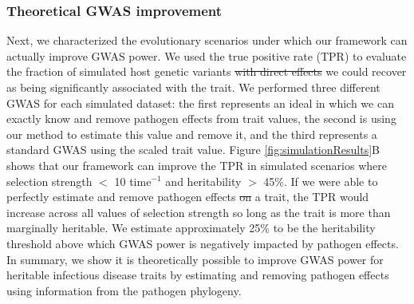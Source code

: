 \documentclass[11pt]{article} %
\providecommand{\DIFadd}[1]{{\protect\color{blue}\uwave{#1}}} %
\providecommand{\DIFdel}[1]{{\protect\color{red}\sout{#1}}}                      %
\providecommand{\DIFaddbegin}{} %
\providecommand{\DIFaddend}{} %
\providecommand{\DIFdelbegin}{} %
\providecommand{\DIFdelend}{} %
\newcommand{\DIFscaledelfig}{0.5}
\newlength{\DIFdelgraphicswidth} %
\newlength{\DIFdelgraphicsheight} %
\newcommand{\DIFaddincludegraphics}[2][]{{\color{blue}\fbox{\DIFOincludegraphics[#1]{#2}}}} %
\newcommand{\DIFdelincludegraphics}[2][]{%
\sbox{\DIFdelgraphicsbox}{\DIFOincludegraphics[#1]{#2}}%
\settoboxwidth{\DIFdelgraphicswidth}{\DIFdelgraphicsbox} %
\settoboxtotalheight{\DIFdelgraphicsheight}{\DIFdelgraphicsbox} %
\scalebox{\DIFscaledelfig}{%
\parbox[b]{\DIFdelgraphicswidth}{\usebox{\DIFdelgraphicsbox}\\[-\baselineskip] \rule{\DIFdelgraphicswidth}{0em}}\llap{\resizebox{\DIFdelgraphicswidth}{\DIFdelgraphicsheight}{%
\setlength{\unitlength}{\DIFdelgraphicswidth}%
\begin{picture}(1,1)%
\thicklines\linethickness{2pt} %
{\color[rgb]{1,0,0}\put(0,0){\framebox(1,1){}}}%
{\color[rgb]{1,0,0}\put(0,0){\line( 1,1){1}}}%
{\color[rgb]{1,0,0}\put(0,1){\line(1,-1){1}}}%
\end{picture}%
}\hspace*{3pt}}} %
} %
\DeclareRobustCommand{\DIFaddbegin}{\DIFOaddbegin \let\includegraphics\DIFaddincludegraphics} %
\DeclareRobustCommand{\DIFaddend}{\DIFOaddend \let\includegraphics\DIFOincludegraphics} %
\DeclareRobustCommand{\DIFdelbegin}{\DIFOdelbegin \let\includegraphics\DIFdelincludegraphics} %
\DeclareRobustCommand{\DIFdelend}{\DIFOaddend \let\includegraphics\DIFOincludegraphics} %
\begin{document}
\begin{linenumbers}
\subsubsection*{Theoretical GWAS improvement}

Next, we characterized the evolutionary scenarios under which our framework can actually improve GWAS power. We used the true positive rate (TPR) to evaluate the fraction of simulated \DIFaddbegin \DIFadd{causal }\DIFaddend host genetic variants \DIFdelbegin \DIFdel{with direct effects }\DIFdelend we could recover as being significantly associated with the trait. We performed three different GWAS for each simulated dataset: the first represents an ideal in which we can exactly know and remove pathogen effects from trait values, the second is using our method to estimate this value and remove it, and the third represents a standard GWAS using the scaled trait value. Figure \ref{fig:simulationResults}B shows that our framework can improve the TPR in simulated scenarios where selection strength $<$ 10 time$^{-1}$ and heritability $>$ 45\%. If we were able to perfectly estimate and remove pathogen effects \DIFdelbegin \DIFdel{on }\DIFdelend \DIFaddbegin \DIFadd{from }\DIFaddend a trait, the TPR would increase across all values of selection strength so long as the trait is more than marginally heritable. We estimate approximately 25\% to be the heritability threshold above which GWAS power is negatively impacted by pathogen effects. In summary, we show it is theoretically possible to improve GWAS power for heritable infectious disease traits by estimating and removing pathogen effects using information from the pathogen phylogeny.



\end{linenumbers}
\end{document}
